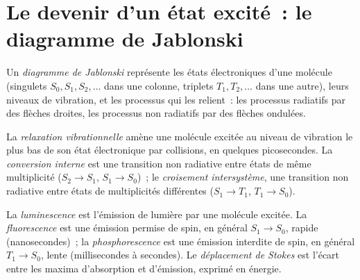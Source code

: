 \section{Le devenir d'un état excité~: le diagramme de Jablonski}

\begin{definition}\label{def:b3:electronic-spectroscopy:jablonski}
Un \emph{diagramme de Jablonski} représente
les états électroniques d'une molécule (singulets $S_0, S_1, S_2, \dots$
dans une colonne, triplets $T_1, T_2,
\dots$ dans une autre), leurs niveaux de vibration, et les processus qui
les relient~: les processus radiatifs par des flèches droites, les
processus non radiatifs par des flèches ondulées.
\end{definition}

\begin{definition}\label{def:b3:electronic-spectroscopy:radiationless}
La \emph{relaxation vibrationnelle} amène
une molécule excitée au niveau de vibration le plus bas de son état
électronique par collisions, en quelques picosecondes. La
\emph{conversion interne}
est une transition non radiative entre états de même
multiplicité ($S_2 \to S_1$, $S_1 \to S_0$)~; le \emph{croisement
intersystème}, une
transition non radiative entre états de multiplicités différentes
($S_1 \to T_1$, $T_1 \to S_0$).
\end{definition}

\begin{definition}\label{def:b3:electronic-spectroscopy:luminescence}
La \emph{luminescence} est l'émission de lumière par
une molécule excitée. La \emph{fluorescence} est une
émission permise de spin,
en général $S_1 \to S_0$, rapide (nanosecondes)~; la \emph{phosphorescence}
est une émission interdite de spin, en général $T_1 \to S_0$, lente
(millisecondes à secondes). Le \emph{déplacement de Stokes} est
l'écart entre les maxima d'absorption et d'émission, exprimé en énergie.
\end{definition}

